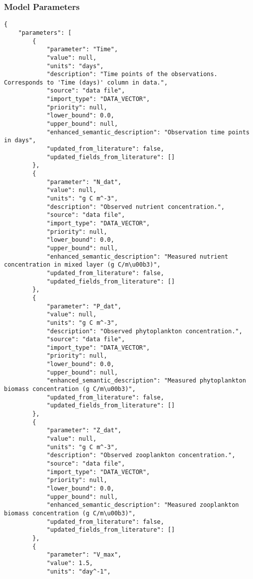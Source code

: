 \subsubsection{Model Parameters}
\begin{lstlisting}
{
    "parameters": [
        {
            "parameter": "Time",
            "value": null,
            "units": "days",
            "description": "Time points of the observations. Corresponds to 'Time (days)' column in data.",
            "source": "data file",
            "import_type": "DATA_VECTOR",
            "priority": null,
            "lower_bound": 0.0,
            "upper_bound": null,
            "enhanced_semantic_description": "Observation time points in days",
            "updated_from_literature": false,
            "updated_fields_from_literature": []
        },
        {
            "parameter": "N_dat",
            "value": null,
            "units": "g C m^-3",
            "description": "Observed nutrient concentration.",
            "source": "data file",
            "import_type": "DATA_VECTOR",
            "priority": null,
            "lower_bound": 0.0,
            "upper_bound": null,
            "enhanced_semantic_description": "Measured nutrient concentration in mixed layer (g C/m\u00b3)",
            "updated_from_literature": false,
            "updated_fields_from_literature": []
        },
        {
            "parameter": "P_dat",
            "value": null,
            "units": "g C m^-3",
            "description": "Observed phytoplankton concentration.",
            "source": "data file",
            "import_type": "DATA_VECTOR",
            "priority": null,
            "lower_bound": 0.0,
            "upper_bound": null,
            "enhanced_semantic_description": "Measured phytoplankton biomass concentration (g C/m\u00b3)",
            "updated_from_literature": false,
            "updated_fields_from_literature": []
        },
        {
            "parameter": "Z_dat",
            "value": null,
            "units": "g C m^-3",
            "description": "Observed zooplankton concentration.",
            "source": "data file",
            "import_type": "DATA_VECTOR",
            "priority": null,
            "lower_bound": 0.0,
            "upper_bound": null,
            "enhanced_semantic_description": "Measured zooplankton biomass concentration (g C/m\u00b3)",
            "updated_from_literature": false,
            "updated_fields_from_literature": []
        },
        {
            "parameter": "V_max",
            "value": 1.5,
            "units": "day^-1",

\end{lstlisting}
